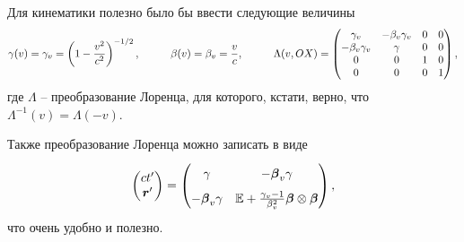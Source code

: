 Для кинематики полезно было бы ввести следующие величины
\begin{equation}
    \gamma(v) = \gamma_v = \left(1 - \frac{v^2}{c^2}\right)^{-1/2},
    \hspace{1 cm}
    \beta(v) = \beta_v = \frac{v}{c},
    \hspace{1 cm}
    \Lambda(v, OX) = \begin{pmatrix}
        \gamma_v & - \beta_v \gamma_v & 0 & 0\\
        - \beta_v \gamma_v & \gamma & 0 & 0\\
        0 & 0 & 1 & 0\\
        0 & 0 & 0 & 1\\
    \end{pmatrix},
\end{equation}
где $\Lambda$ -- преобразование Лоренца, для которого, кстати, верно, что $\Lambda^{-1} (v) = \Lambda(-v)$.

Также преобразование Лоренца можно записать в виде
\begin{equation}
\label{LORENTS}
    \begin{pmatrix}
        c t' \\ \vc{r}'
    \end{pmatrix} = 
    \begin{pmatrix}
        \gamma & - \vc{\beta}_v \gamma 
        \vphantom{\dfrac{1}{2}} \\
        - \vc{\beta}_v \gamma & \mathbb{E} + \frac{\gamma_v - 1}{\beta_v^2} \vc{\beta} \otimes \vc{\beta}  
        \vphantom{\dfrac{1}{2}} \\
    \end{pmatrix},
\end{equation}
что очень удобно и полезно.

